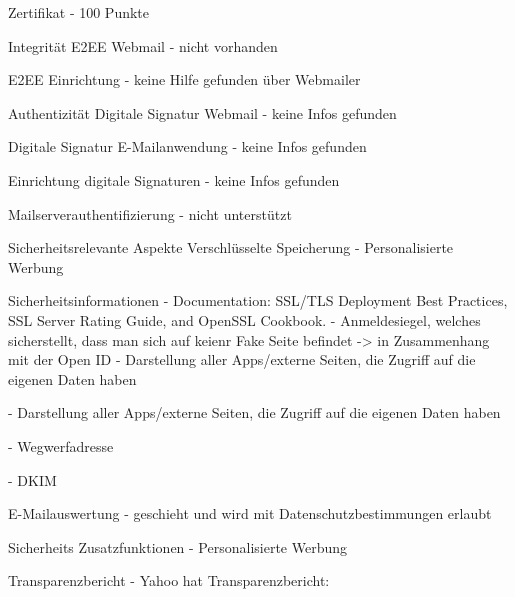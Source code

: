 \documentclass  [paper=a4,
				fontsize=12pt,
				listof=totoc,
				bibliography=totoc
				]{scrreprt}
\begin{document}
			Zertifikat
			- 100 Punkte
			
			Integrität
			E2EE Webmail
			- nicht vorhanden
			
			E2EE Einrichtung
			- keine Hilfe gefunden über Webmailer
			
			Authentizität
			Digitale Signatur Webmail
			- keine Infos gefunden
			
			Digitale Signatur E-Mailanwendung
			- keine Infos gefunden
			
			Einrichtung digitale Signaturen
			- keine Infos gefunden
			
			Mailserverauthentifizierung
			- nicht unterstützt
			
			Sicherheitsrelevante Aspekte
			Verschlüsselte Speicherung
			- Personalisierte Werbung
			
			Sicherheitsinformationen
			- Documentation: SSL/TLS Deployment Best Practices, SSL Server Rating Guide, and OpenSSL Cookbook. 
			- Anmeldesiegel, welches sicherstellt, dass man sich auf keienr Fake Seite befindet -> in Zusammenhang mit der Open ID
			- Darstellung aller Apps/externe Seiten, die Zugriff auf die eigenen Daten haben
			
			- Darstellung aller Apps/externe Seiten, die Zugriff auf die eigenen Daten haben
			
			- Wegwerfadresse
			
			- DKIM
			
			E-Mailauswertung
			- geschieht und wird mit Datenschutzbestimmungen erlaubt
			
			Sicherheits Zusatzfunktionen
			- Personalisierte Werbung
			
			Transparenzbericht
			- Yahoo hat Transparenzbericht:

		
			\pagebreak
\end{document}
